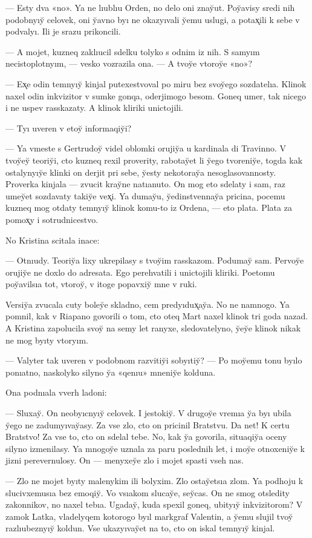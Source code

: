 \documentclass[10pt]{book}
\begin{document}
— Esty dva «no». Ya ne lıublıu Orden, no delo oni znay̆ut. Poy̆avisy sredi nih podobnyıy̆ celovek, oni y̆avno byı ne okazyıvali y̆emu uslugi, a potax̨ili k sebe v podvalyı. Ili je srazu prikoncili.

— A mojet, kuzneq zaklıucil sdelku tolyko s odnim iz nih. S samyım necistoplotnyım, — vesko vozrazila ona. — A tvoy̆e vtoroy̆e «no»?

— Ex̨e odin temnyıy̆ kinjal putexestvoval po miru bez svoy̆ego sozdatelıa. Klinok naxel odin inkvizitor v sumke gonqa, oderjimogo besom. Goneq umer, tak nicego i ne uspev rasskazaty. A klinok kliriki unictojili.

— Tyı uveren v etoy̆ informaqiy̆i?

— Ya vmeste s Gertrudoy̆ videl oblomki orujiy̆a u kardinala di Travinno. V tvoy̆ey̆ teoriy̆i, cto kuzneq rexil proverity, rabotay̆et li y̆ego tvoreniy̆e, togda kak ostalynyıy̆e klinki on derjit pri sebe, y̆esty nekotoray̆a nesoglasovannosty. Proverka kinjala — zvucit kray̆ne natıanuto. On mog eto sdelaty i sam, raz umey̆et sozdavaty takiy̆e vex̨i. Ya dumay̆u, y̆edinstvennay̆a pricina, pocemu kuzneq mog otdaty temnyıy̆ klinok komu-to iz Ordena, — eto plata. Plata za pomox̨y i sotrudnicestvo.

No Kristina scitala inace:

— Otnıudy. Teoriy̆a lixy ukrepilasy s tvoy̆im rasskazom. Podumay̆ sam. Pervoy̆e orujiy̆e ne doxlo do adresata. Ego perehvatili i unictojili kliriki. Poetomu poy̆avilsıa tot, vtoroy̆, v itoge popavxiy̆ mne v ruki.

Versiy̆a zvucala cuty boley̆e skladno, cem predyıdux̨ay̆a. No ne namnogo. Ya pomnil, kak v Riapano govorili o tom, cto oteq Mart naxel klinok tri goda nazad. A Kristina zapolucila svoy̆ na semy let ranyxe, sledovatelyno, y̆ey̆e klinok nikak ne mog byıty vtoryım.

— Valyter tak uveren v podobnom razvitiy̆i sobyıtiy̆? — Po moy̆emu tonu byılo ponıatno, naskolyko silyno y̆a «qenıu» mneniy̆e kolduna.

Ona podnıala vverh ladoni:

— Sluxay̆. On neobyıcnyıy̆ celovek. I jestokiy̆. V drugoy̆e vremıa y̆a byı ubila y̆ego ne zadumyıvay̆asy. Za vse zlo, cto on pricinil Bratstvu. Da net! K certu Bratstvo! Za vse to, cto on sdelal tebe. No, kak y̆a govorila, situaqiy̆a oceny silyno izmenilasy. Ya mnogoy̆e uznala za paru poslednih let, i moy̆e otnoxeniy̆e k jizni perevernulosy. On — menyxey̆e zlo i mojet spasti vseh nas.

— Zlo ne mojet byıty malenykim ili bolyxim. Zlo ostay̆etsıa zlom. Ya podhoju k slucivxemusıa bez emoqiy̆. Vo vsıakom slucay̆e, sey̆cas. On ne smog otsledity zakonnikov, no naxel tebıa. Ugaday̆, kuda spexil goneq, ubityıy̆ inkvizitorom? V zamok Latka, vladelyqem kotorogo byıl markgraf Valentin, a y̆emu slujil tvoy̆ razlıubeznyıy̆ koldun. Vse ukazyıvay̆et na to, cto on iskal temnyıy̆ kinjal.
\end{document}
